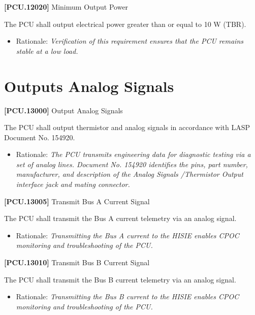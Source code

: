 \documentclass[12pt,oneside,oldfontcommands]{memoir}
\begin{document}
\textbf{[PCU.12020]} Minimum Output Power

The \gls{PCU} shall output electrical power greater than or equal to 10 W (TBR\label{tbx_6}).

\begin{itemize}
\item{} Rationale: \emph{Verification of this requirement ensures that the PCU remains stable at a low load.}

\end{itemize}

\section{Outputs Analog Signals}
\label{outputsanalogsignals}

\textbf{[PCU.13000]} Output Analog Signals

The \gls{PCU} shall output thermistor and analog signals in accordance with \gls{LASP} Document No. 154920.

\begin{itemize}
\item{} Rationale: \emph{The PCU transmits engineering data for diagnostic testing via a set of analog lines. Document No. 154920 identifies the pins, part number, manufacturer, and description of the Analog Signals \slash  Thermistor Output interface jack and mating connector.}

\end{itemize}

\textbf{[PCU.13005]} Transmit Bus A Current Signal

The \gls{PCU} shall transmit the Bus A current telemetry via an analog signal.

\begin{itemize}
\item{} Rationale: \emph{Transmitting the Bus A current to the HISIE enables CPOC monitoring and troubleshooting of the PCU.}

\end{itemize}

\textbf{[PCU.13010]} Transmit Bus B Current Signal

The \gls{PCU} shall transmit the Bus B current telemetry via an analog signal.

\begin{itemize}
\item{} Rationale: \emph{Transmitting the Bus B current to the HISIE enables CPOC monitoring and troubleshooting of the PCU.}

\end{itemize}
\end{document}
